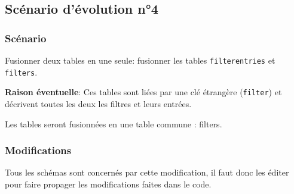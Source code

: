 \subsection{Scénario d'évolution n°4}
\subsubsection{Scénario}
Fusionner deux tables en une seule: fusionner les tables \texttt{filterentries} et \texttt{filters}.

\textbf{Raison éventuelle}: Ces tables sont liées par une clé étrangère (\texttt{filter}) et décrivent toutes les deux les filtres et leurs entrées.

Les tables seront fusionnées en une table commune : filters.
\subsubsection{Modifications}
Tous les schémas sont concernés par cette modification, il faut donc les éditer pour faire propager les modifications faites dans le code.

